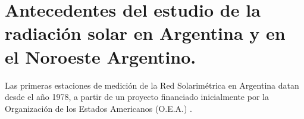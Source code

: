\section{Antecedentes del estudio de la radiación solar en Argentina y en el Noroeste Argentino.}

Las primeras estaciones de medición de la Red Solarimétrica en Argentina datan desde el año 1978, a partir de un proyecto financiado inicialmente por la Organización de los Estados Americanos (O.E.A.) \citep{GrossiGallegos1999}.

